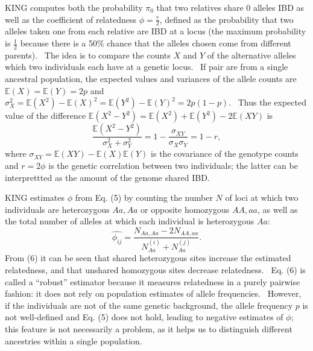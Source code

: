 \documentclass[
]{book}
\begin{document}
KING\cite{manichaikul_robust_2010} computes both the probability \(\pi_0\) that two relatives share 0 alleles IBD as well as the coefficient of relatedness \(\phi=\frac{r}{2}\), defined as the probability that two alleles taken one from each relative are IBD at a locus (the maximum probability is \(\frac{1}{2}\) because there is a 50\% chance that the alleles chosen come from different parents).~ The idea is to compare the counts \(X\) and \(Y\) of the alternative alleles which two individuals each have at a genetic locus.~ If pair are from a single ancestral population, the expected values and variances of the allele counts are \(\mathbb{E}\left(X\right)=\mathbb{E}\left(Y\right)=2p\) and \(\sigma_X^2=\mathbb{E}\left(X^2\right)-\mathbb{E}\left(X\right)^2=\mathbb{E}\left(Y^2\right)-\mathbb{E}\left(Y\right)^2=2p\left(1-p\right)\).~ Thus the expected value of the difference \(\mathbb{E}\left(X^2-Y^2\right)=\mathbb{E}\left(X^2\right)+\mathbb{E}\left(Y^2\right)-2\mathbb{E}\left(XY\right)\) is\begin{equation}\frac{\mathbb{E}\left(X^2-Y^2\right)}{\sigma_X^2+\sigma_Y^2}=1-\frac{\sigma_{XY}}{\sigma_X\sigma_Y}=1-r,\tag{5}\end{equation}where \(\sigma_{XY}=\mathbb{E}\left(XY\right)-\mathbb{E}\left(X\right)\mathbb{E}\left(Y\right)\) is the covariance of the genotype counts and \(r=2\phi\) is the genetic correlation between two individuals; the latter can be interprettted as the amount of the genome shared IBD.

KING estimates \(\phi\) from Eq. (5) by counting the number \(N\) of loci at which two individuals are heterozygous \(Aa,Aa\) or opposite homozygous \(AA,aa\), as well as the total number of alleles at which each individual is heterozygous \(Aa\):\begin{equation}\hat{\phi_{ij}}=\frac{N_{Aa,Aa}-2N_{AA,aa}}{N_{Aa}^{\left(i\right)}+N_{Aa}^{\left(j\right)}}.\tag{6}\end{equation}From (6) it can be seen that shared heterozygous sites increase the estimated relatedness, and that unshared homozygous sites decrease relatedness.~ Eq. (6) is called a ``robust'' estimator because it measures relatedness in a purely pairwise fashion: it does not rely on population estimates of allele frequencies.~ However, if the individuals are not of the same genetic background, the allele frequency \(p\) is not well-defined and Eq. (5) does not hold, leading to negative estimates of \(\phi\); this feature is not necessarily a problem, as it helps us to distinguish different ancestries within a single population.

\printbibliography
\end{document}
